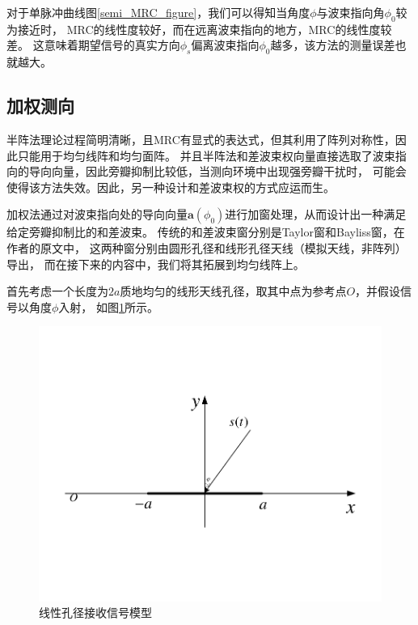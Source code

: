 \documentclass[master]{thesis-uestc}
\begin{document}
对于单脉冲曲线图\ref{semi_MRC_figure}，我们可以得知当角度$\phi$与波束指向角$\phi_0$较为接近时，
MRC的线性度较好，而在远离波束指向的地方，MRC的线性度较差。
这意味着期望信号的真实方向$\phi_s$偏离波束指向$\phi_0$越多，该方法的测量误差也就越大。

\subsection{加权测向}
半阵法理论过程简明清晰，且MRC有显式的表达式，但其利用了阵列对称性，因此只能用于均匀线阵和均匀面阵。
并且半阵法和差波束权向量直接选取了波束指向的导向向量，因此旁瓣抑制比较低，当测向环境中出现强旁瓣干扰时，
可能会使得该方法失效。因此，另一种设计和差波束权的方式应运而生。

加权法通过对波束指向处的导向向量$\bm{a}(\phi_0)$进行加窗处理，从而设计出一种满足给定旁瓣抑制比的和差波束。
传统的和差波束窗分别是Taylor窗和Bayliss窗，在作者的原文中，
这两种窗分别由圆形孔径和线形孔径天线（模拟天线，非阵列）导出，
而在接下来的内容中，我们将其拓展到均匀线阵上。

首先考虑一个长度为$2a$质地均匀的线形天线孔径，取其中点为参考点$O$，并假设信号以角度$\phi$入射，
如图\ref{linear_aperture}所示。
\begin{figure}[h]
    \includegraphics[scale=0.8]{pic/linear aperture.pdf}
    \caption{线性孔径接收信号模型}
    \label{linear_aperture}
\end{figure}
\end{document}
